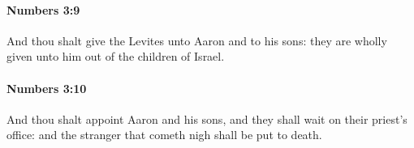 		\paragraph{Numbers 3:9} %
			\label{NUMBERS-3-9}

			And thou shalt give the Levites unto Aaron and to his sons: they are wholly given unto him out of the children of Israel.


		\paragraph{Numbers 3:10} %
			\label{NUMBERS-3-10}

			And thou shalt appoint Aaron and his sons, and they shall wait on their priest’s office: and the stranger that cometh nigh shall be put to death.


